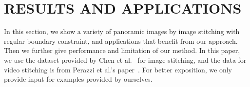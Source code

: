 \documentclass[10pt,journal,compsoc]{IEEEtran}
\begin{document}
\begin{comment}
Based on the piecewise rectangular boundary, we further optimize our image stitching by iterative optimization, as shown in Algorithm~\ref{alg:piecewise_rectangling}.
We first redefine the energy term $\phi_r$  in Equ.~\ref{equ:content_preserving_stitching} using the piecewise rectangular boundary constraint as
\begin{equation} \label{equ:piecewise_boundary}
\begin{split}
   &\widetilde{\phi_r}(\mathbf{V})=\sum\limits_{i=1}^4\sum\limits_{S^i_j \in \Re(i)}\sum\limits_{V_k \in S^i_j}|| \Lambda_{01}^i[\zeta[V_k] V_k+(1-\zeta[V_k])\\
   &(\kappa[V_k] \cdot \eta[V_k])]-S^i_j.val ||^2
\end{split}
\end{equation}

Then the energy function for rectangling stitching is redefined as
\begin{equation} \label{equ:piecewise_stitching}
\widetilde{\Phi}(\textbf{V})=\Phi_{stitch}(\textbf{V})+\gamma_r \widetilde{\phi_r}(\textbf{V})+\gamma_l \phi_l(\textbf{V}),
\end{equation}

\end{comment}

 \section{RESULTS AND APPLICATIONS}

In this section, we show a variety of panoramic images by image stitching with regular boundary constraint, and applications that benefit from our approach.
Then we further give performance and limitation of our method.
In this paper, we use the dataset provided by Chen et al.~\cite{conf/eccv/ChenC16} for image stitching, and the data for video stitching is from Perazzi et al.'s paper~\cite{journals/cgf/PerazziSZKWWG15}. For better exposition, we only provide input for examples provided by ourselves.
\end{document}
